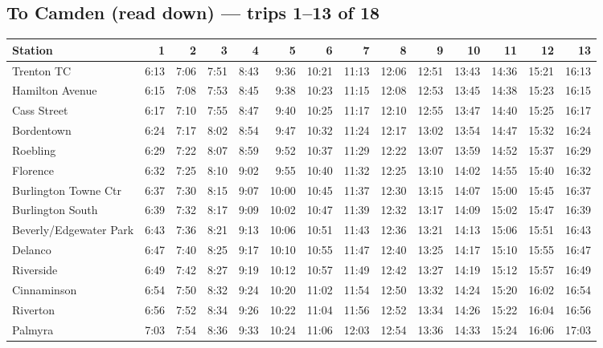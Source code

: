\subsection*{To Camden (read down) --- trips 1--13 of 18}
\begin{center}\footnotesize\setlength{\tabcolsep}{3pt}\begin{tabular}{@{}lrrrrrrrrrrrrr@{}}\toprule
Station & 1 & 2 & 3 & 4 & 5 & 6 & 7 & 8 & 9 & 10 & 11 & 12 & 13 \\\midrule
Trenton TC & 6:13 & 7:06 & 7:51 & 8:43 & 9:36 & 10:21 & 11:13 & 12:06 & 12:51 & 13:43 & 14:36 & 15:21 & 16:13 \\
Hamilton Avenue & 6:15 & 7:08 & 7:53 & 8:45 & 9:38 & 10:23 & 11:15 & 12:08 & 12:53 & 13:45 & 14:38 & 15:23 & 16:15 \\
Cass Street & 6:17 & 7:10 & 7:55 & 8:47 & 9:40 & 10:25 & 11:17 & 12:10 & 12:55 & 13:47 & 14:40 & 15:25 & 16:17 \\
Bordentown & 6:24 & 7:17 & 8:02 & 8:54 & 9:47 & 10:32 & 11:24 & 12:17 & 13:02 & 13:54 & 14:47 & 15:32 & 16:24 \\
Roebling & 6:29 & 7:22 & 8:07 & 8:59 & 9:52 & 10:37 & 11:29 & 12:22 & 13:07 & 13:59 & 14:52 & 15:37 & 16:29 \\
Florence & 6:32 & 7:25 & 8:10 & 9:02 & 9:55 & 10:40 & 11:32 & 12:25 & 13:10 & 14:02 & 14:55 & 15:40 & 16:32 \\
Burlington Towne Ctr & 6:37 & 7:30 & 8:15 & 9:07 & 10:00 & 10:45 & 11:37 & 12:30 & 13:15 & 14:07 & 15:00 & 15:45 & 16:37 \\
Burlington South & 6:39 & 7:32 & 8:17 & 9:09 & 10:02 & 10:47 & 11:39 & 12:32 & 13:17 & 14:09 & 15:02 & 15:47 & 16:39 \\
Beverly/Edgewater Park & 6:43 & 7:36 & 8:21 & 9:13 & 10:06 & 10:51 & 11:43 & 12:36 & 13:21 & 14:13 & 15:06 & 15:51 & 16:43 \\
Delanco & 6:47 & 7:40 & 8:25 & 9:17 & 10:10 & 10:55 & 11:47 & 12:40 & 13:25 & 14:17 & 15:10 & 15:55 & 16:47 \\
Riverside & 6:49 & 7:42 & 8:27 & 9:19 & 10:12 & 10:57 & 11:49 & 12:42 & 13:27 & 14:19 & 15:12 & 15:57 & 16:49 \\
Cinnaminson & 6:54 & 7:50 & 8:32 & 9:24 & 10:20 & 11:02 & 11:54 & 12:50 & 13:32 & 14:24 & 15:20 & 16:02 & 16:54 \\
Riverton & 6:56 & 7:52 & 8:34 & 9:26 & 10:22 & 11:04 & 11:56 & 12:52 & 13:34 & 14:26 & 15:22 & 16:04 & 16:56 \\
Palmyra & 7:03 & 7:54 & 8:36 & 9:33 & 10:24 & 11:06 & 12:03 & 12:54 & 13:36 & 14:33 & 15:24 & 16:06 & 17:03 \\

\end{tabular}
\end{center}
